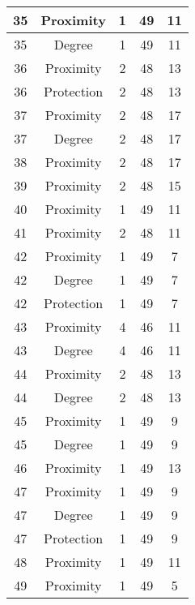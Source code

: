 \documentclass[results.tex]{subfiles}
\begin{document}
\begin{center}
\begin{tabular}{| c || c | c | c | c |}
    \hline
    35 & Proximity & 1 & 49 & 11 \\ 
    \hline
    35 & Degree & 1 & 49 & 11 \\ 
    \hline
    36 & Proximity & 2 & 48 & 13 \\ 
    \hline
    36 & Protection & 2 & 48 & 13 \\ 
    \hline
    37 & Proximity & 2 & 48 & 17 \\ 
    \hline
    37 & Degree & 2 & 48 & 17 \\ 
    \hline
    38 & Proximity & 2 & 48 & 17 \\ 
    \hline
    39 & Proximity & 2 & 48 & 15 \\ 
    \hline
    40 & Proximity & 1 & 49 & 11 \\ 
    \hline
    41 & Proximity & 2 & 48 & 11 \\ 
    \hline
    42 & Proximity & 1 & 49 & 7 \\ 
    \hline
    42 & Degree & 1 & 49 & 7 \\ 
    \hline
    42 & Protection & 1 & 49 & 7 \\ 
    \hline
    43 & Proximity & 4 & 46 & 11 \\ 
    \hline
    43 & Degree & 4 & 46 & 11 \\ 
    \hline
    44 & Proximity & 2 & 48 & 13 \\ 
    \hline
    44 & Degree & 2 & 48 & 13 \\ 
    \hline
    45 & Proximity & 1 & 49 & 9 \\ 
    \hline
    45 & Degree & 1 & 49 & 9 \\ 
    \hline
    46 & Proximity & 1 & 49 & 13 \\ 
    \hline
    47 & Proximity & 1 & 49 & 9 \\ 
    \hline
    47 & Degree & 1 & 49 & 9 \\ 
    \hline
    47 & Protection & 1 & 49 & 9 \\ 
    \hline
    48 & Proximity & 1 & 49 & 11 \\ 
    \hline
    49 & Proximity & 1 & 49 & 5 \\ 
    \hline   \end{tabular}
\end{center}
\end{document}
